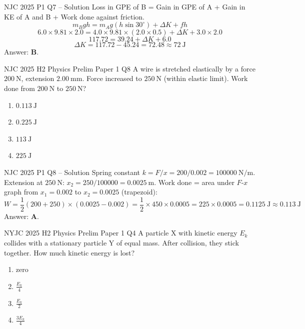 \documentclass[11pt]{beamer}
\begin{document}
\begin{frame}{NJC 2025 P1 Q7 – Solution}
Loss in GPE of B = Gain in GPE of A + Gain in KE of A and B + Work done against friction.
\[ m_B g h = m_A g (h\sin30^\circ) + \Delta K + f h \]
\[ 6.0\times9.81\times2.0 = 4.0\times9.81\times(2.0\times0.5) + \Delta K + 3.0\times2.0 \]
\[ 117.72 = 39.24 + \Delta K + 6.0 \]
\[ \Delta K = 117.72 - 45.24 = 72.48 \approx 72\ \mathrm{J} \]
Answer: \textbf{B}.
\end{frame}

\begin{frame}[shrink=15]{NJC 2025 H2 Physics Prelim Paper 1 Q8}
A wire is stretched elastically by a force $200\ \mathrm{N}$, extension $2.00\ \mathrm{mm}$. Force increased to $250\ \mathrm{N}$ (within elastic limit). Work done from $200\ \mathrm{N}$ to $250\ \mathrm{N}$?
\begin{enumerate}[A]
    \item $0.113\ \mathrm{J}$
    \item $0.225\ \mathrm{J}$
    \item $113\ \mathrm{J}$
    \item $225\ \mathrm{J}$
\end{enumerate}
\end{frame}

\begin{frame}{NJC 2025 P1 Q8 – Solution}
Spring constant $k = F/x = 200 / 0.002 = 100000\ \mathrm{N/m}$.
Extension at $250\ \mathrm{N}$: $x_2 = 250 / 100000 = 0.0025\ \mathrm{m}$.
Work done = area under $F$-$x$ graph from $x_1=0.002$ to $x_2=0.0025$ (trapezoid):
\[ W = \frac12 (200 + 250) \times (0.0025 - 0.002) = \frac12 \times 450 \times 0.0005 = 225 \times 0.0005 = 0.1125\ \mathrm{J} \approx 0.113\ \mathrm{J} \]
Answer: \textbf{A}.
\end{frame}

\begin{frame}[shrink=15]{NYJC 2025 H2 Physics Prelim Paper 1 Q4}
A particle X with kinetic energy $E_k$ collides with a stationary particle Y of equal mass. After collision, they stick together. How much kinetic energy is lost?
\begin{enumerate}[A]
    \item zero
    \item $\frac{E_k}{4}$
    \item $\frac{E_k}{2}$
    \item $\frac{3E_k}{4}$
\end{enumerate}
\end{frame}
\end{document}
